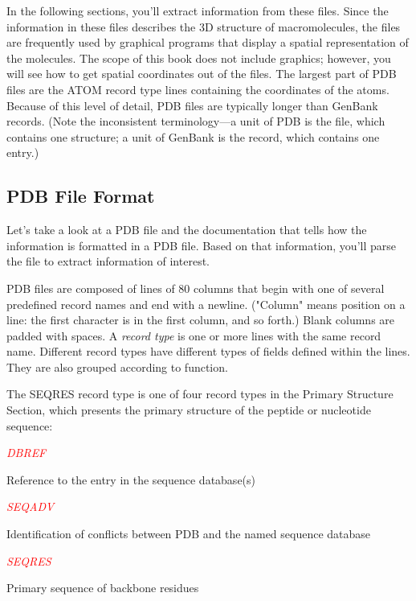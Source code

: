 In the following sections, you'll extract information from these files. Since the information in these files describes the 3D structure of macromolecules, the files are frequently used by graphical programs that display a spatial representation of the molecules. The scope of this book does not include graphics; however, you will see how to get spatial coordinates out of the files. The largest part of PDB files are the ATOM record type lines containing the coordinates of the atoms. Because of this level of detail, PDB files are typically longer than GenBank records. (Note the inconsistent terminology—a unit of PDB is the file, which contains one structure; a unit of GenBank is the record, which contains one entry.) 

\subsection{PDB File Format}
Let's take a look at a PDB file and the documentation that tells how the information is formatted in a PDB file. Based on that information, you'll parse the file to extract information of interest.

PDB files are composed of lines of 80 columns that begin with one of several predefined record names and end with a newline. ("Column" means position on a line: the first character is in the first column, and so forth.) Blank columns are padded with spaces. A \textit{record type} is one or more lines with the same record name. Different record types have different types of fields defined within the lines. They are also grouped according to function.

The SEQRES record type is one of four record types in the Primary Structure Section, which presents the primary structure of the peptide or nucleotide sequence: 

\textcolor{red}{\textit{DBREF}}
\begin{adjustwidth}{1cm}{}
Reference to the entry in the sequence database(s)
\end{adjustwidth}

\textcolor{red}{\textit{SEQADV}}
\begin{adjustwidth}{1cm}{}
Identification of conflicts between PDB and the named sequence database 
\end{adjustwidth}

\textcolor{red}{\textit{SEQRES}}
\begin{adjustwidth}{1cm}{}
Primary sequence of backbone residues 
\end{adjustwidth}

